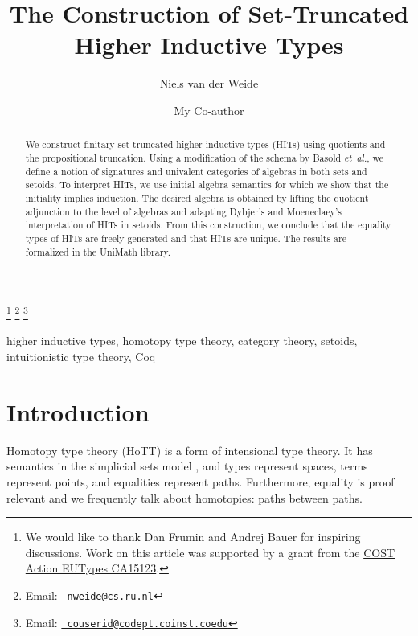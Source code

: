 \documentclass[9pt]{entcs}
\newcommand{\etal}{\emph{et~al.}}
\newcommand{\0}{\textbf{0}} %
\newcommand{\1}{\textbf{1}} %
\begin{document}
\begin{frontmatter}
  \title{The Construction of Set-Truncated Higher Inductive Types} \author{Niels van der Weide
    }
  \address{Institute for Computation and Information Sciences\\ Radboud Universiteit\\
    Nijmegen, The Netherlands} \author{My Co-author}
  \address{My Co-author's Department\\My Co-author's University\\
    My Co-author's City, My Co-author's Country} \thanks[ALL]{We would like to thank Dan Frumin and Andrej Bauer for inspiring discussions. Work on this article was supported by a grant from the \href{https://eutypes.cs.ru.nl/}{COST Action EUTypes CA15123}.} \thanks[myemail]{Email:
    \href{mailto:nweide@cs.ru.nl} {\texttt{\normalshape
        nweide@cs.ru.nl}}} \thanks[coemail]{Email:
    \href{mailto:couserid@codept.coinst.coedu} {\texttt{\normalshape
        couserid@codept.coinst.coedu}}}
\begin{abstract} 
  We construct finitary set-truncated higher inductive types (HITs) using quotients and the propositional truncation.
  Using a modification of the schema by Basold \etal, we define a notion of signatures and univalent categories of algebras in both sets and setoids.
  To interpret HITs, we use initial algebra semantics for which we show that the initiality implies induction.
  The desired algebra is obtained by lifting the quotient adjunction to the level of algebras and adapting Dybjer's and Moeneclaey's interpretation of HITs in setoids.
  From this construction, we conclude that the equality types of HITs are freely generated and that HITs are unique.
  The results are formalized in the UniMath library.
\end{abstract}
\begin{keyword}
higher inductive types, homotopy type theory, category theory, setoids, intuitionistic type theory, Coq
\end{keyword}
\end{frontmatter}
\section{Introduction}
\label{intro}
Homotopy type theory (HoTT) is a form of intensional type theory. 
It has semantics in the simplicial sets model \cite{simpset}, and types represent spaces, terms represent points, and equalities represent paths.
Furthermore, equality is proof relevant and we frequently talk about homotopies: paths between paths.
\end{document}
